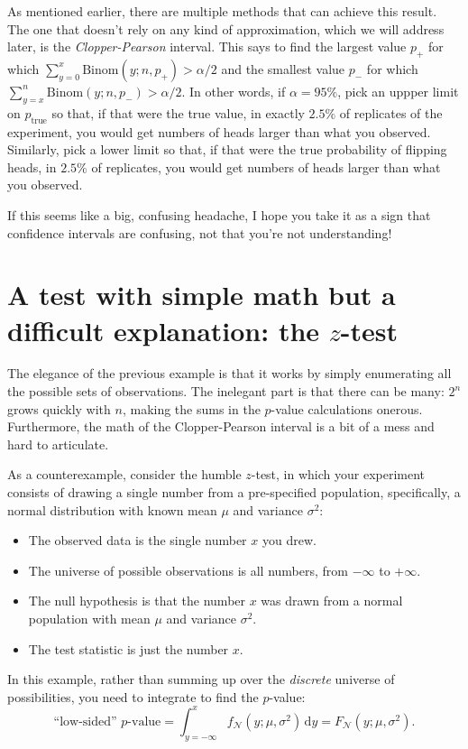 As mentioned earlier, there are multiple methods that can achieve this result.
The one that doesn't rely on any kind of approximation, which we will address
later, is the \emph{Clopper-Pearson} interval. This says to find the largest
value $p_+$ for which $\sum_{y=0}^x \mathrm{Binom}(y; n, p_+) > \alpha/2$ and
the smallest value $p_-$ for which $\sum_{y=x}^n \mathrm{Binom}(y; n, p_-) >
\alpha/2$. In other words, if $\alpha=95\%$, pick an uppper limit on
$p_\mathrm{true}$ so that, if that were the true value, in exactly $2.5\%$ of
replicates of the experiment, you would get numbers of heads larger than what
you observed. Similarly, pick a lower limit so that, if that were the true
probability of flipping heads, in $2.5\%$ of replicates, you would get numbers
of heads larger than what you observed.

If this seems like a big, confusing headache, I hope you take it as a sign that
confidence intervals are confusing, not that you're not understanding!

\section{A test with simple math but a difficult explanation: the $z$-test}

The elegance of the previous example is that it works by simply enumerating all
the possible sets of observations. The inelegant part is that there can be
many: $2^n$ grows quickly with $n$, making the sums in the $p$-value
calculations onerous. Furthermore, the math of the Clopper-Pearson interval is
a bit of a mess and hard to articulate.

As a counterexample, consider the humble $z$-test, in which your experiment consists of drawing a single number from a pre-specified population, specifically, a normal distribution with known mean $\mu$ and variance $\sigma^2$:
\begin{itemize}
\item The observed data is the single number $x$ you drew.
\item The universe of possible observations is all numbers, from $-\infty$ to $+\infty$.
\item The null hypothesis is that the number $x$ was drawn from a normal population with mean $\mu$ and variance $\sigma^2$.
\item The test statistic is just the number $x$.
\end{itemize}

In this example, rather than summing up over the \emph{discrete} universe of possibilities, you need to integrate to find the $p$-value:
\begin{equation}
  \text{``low-sided'' $p$-value} = \int_{y=-\infty}^x f_\mathcal{N}(y; \mu, \sigma^2) \,\mathrm{d}y = F_\mathcal{N}(y; \mu, \sigma^2).
\end{equation}

